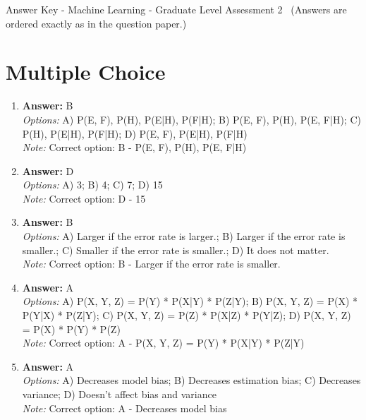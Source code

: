 \documentclass[12pt]{article}
\begin{document}
\begin{center}
Answer Key - Machine Learning - Graduate Level Assessment 2 \
\small (Answers are ordered exactly as in the question paper.)
\end{center}

\section*{Multiple Choice}
\begin{enumerate}[label=\arabic*.]
\item \textbf{Answer:} B
\\ \textit{Options:} A) P(E, F), P(H), P(E|H), P(F|H); B) P(E, F), P(H), P(E, F|H); C) P(H), P(E|H), P(F|H); D) P(E, F), P(E|H), P(F|H)
\\ \textit{Note:} Correct option: B - P(E, F), P(H), P(E, F|H)
\item \textbf{Answer:} D
\\ \textit{Options:} A) 3; B) 4; C) 7; D) 15
\\ \textit{Note:} Correct option: D - 15
\item \textbf{Answer:} B
\\ \textit{Options:} A) Larger if the error rate is larger.; B) Larger if the error rate is smaller.; C) Smaller if the error rate is smaller.; D) It does not matter.
\\ \textit{Note:} Correct option: B - Larger if the error rate is smaller.
\item \textbf{Answer:} A
\\ \textit{Options:} A) P(X, Y, Z) = P(Y) * P(X|Y) * P(Z|Y); B) P(X, Y, Z) = P(X) * P(Y|X) * P(Z|Y); C) P(X, Y, Z) = P(Z) * P(X|Z) * P(Y|Z); D) P(X, Y, Z) = P(X) * P(Y) * P(Z)
\\ \textit{Note:} Correct option: A - P(X, Y, Z) = P(Y) * P(X|Y) * P(Z|Y)
\item \textbf{Answer:} A
\\ \textit{Options:} A) Decreases model bias; B) Decreases estimation bias; C) Decreases variance; D) Doesn't affect bias and variance
\\ \textit{Note:} Correct option: A - Decreases model bias
\end{enumerate}
\end{document}
